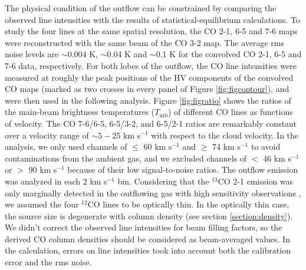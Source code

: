 The physical condition of the outflow can be constrained by comparing the observed line intensities with the results of statistical-equilibrium calculations. To study the four lines at the same spatial resolution, the CO 2-1, 6-5 and 7-6 maps were reconstructed with the same beam of the CO 3-2 map. The average rms noise levels are $\sim$0.004 K, $\sim$0.04 K and $\sim$0.1 K for the convolved CO 2-1, 6-5 and 7-6 data, respectively. For both lobes of the outflow, the CO line intensities were measured at roughly the peak positions of the HV components of the convolved CO maps (marked as two crosses in every panel of Figure \ref{fig:figcontour}), and were then used in the following analysis. Figure \ref{fig:figratio} shows the ratios of the main-beam brightness temperatures ($T_{\mathrm{mb}}$) of different CO lines as functions of velocity. The CO 7-6/6-5, 6-5/3-2, and 6-5/2-1 ratios are remarkably constant over a velocity range of $\sim 5-25$ km s$^{-1}$ with respect to the cloud velocity. In the analysis, we only used channels of $\le$ 60 km s$^{-1}$ and $\ge$ 74 km s$^{-1}$ to avoid contaminations from the ambient gas, and we excluded channels of $<$ 46 km s$^{-1}$ or $>$ 90 km s$^{-1}$ because of their low signal-to-noise ratios. The outflow emission was analyzed in each 2 km s$^{-1}$ bin. Considering that the $^{13}$CO 2-1 emission was only marginally detected in the outflowing gas with high sensitivity observations \citep{2009ApJ...696...66Q}, we assumed the four $^{12}$CO lines to be optically thin. In the optically thin case, the source size is degenerate with column density (see section \ref{section:density}). We didn't correct the observed line intensities for beam filling factors, so the derived CO column densities should be considered as beam-averaged values. In the calculation, errors on line intensities took into account both the calibration error and the rms noise. 

